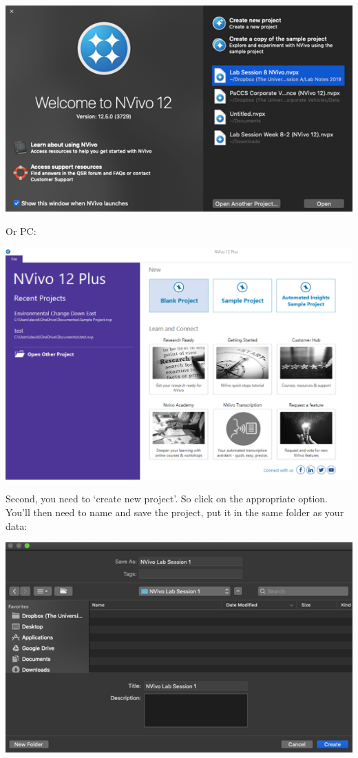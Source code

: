 \documentclass[
]{book}
\begin{document}
\includegraphics{imgs/welcome_mac.png}

Or PC:

\includegraphics{imgs/open_nvivo.png}

Second, you need to `create new project'. So click on the appropriate option. You'll then need to name and save the project, put it in the same folder as your data:

\includegraphics{imgs/nvivo_folder.png}
\end{document}
